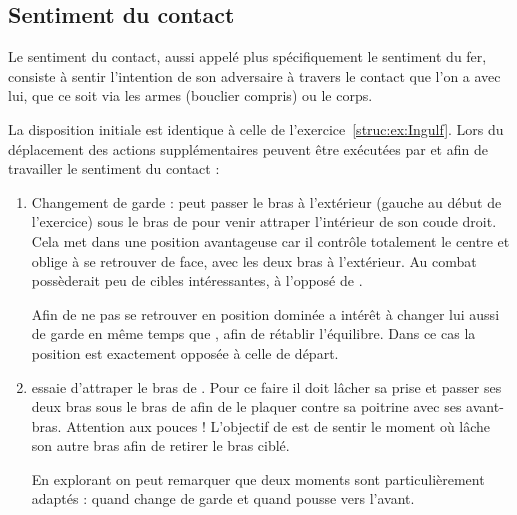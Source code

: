 \subsection{Sentiment du contact}


\begin{definition}

Le sentiment du contact, aussi appelé plus spécifiquement le sentiment du fer, consiste à sentir l'intention de son adversaire à travers le contact que l'on a avec lui, que ce soit via les armes (bouclier compris) ou le corps.
\end{definition}


\begin{exercice}
\label{att:ex:Ingulf-variantes}


La disposition initiale est identique à celle de l'exercice~\ref{struc:ex:Ingulf}.
Lors du déplacement des actions supplémentaires peuvent être exécutées par \A et \D afin de travailler le sentiment du contact :
\begin{enumerate}
	\item Changement de garde : \A peut passer le bras à l'extérieur (gauche au début de l'exercice) sous le bras de \D pour venir attraper l'intérieur de son coude droit.
	Cela met \A dans une position avantageuse car il contrôle totalement le centre et oblige \D à se retrouver de face, avec les deux bras à l'extérieur.
	Au combat \D possèderait peu de cibles intéressantes, à l'opposé de \A.
	
	Afin de ne pas se retrouver en position dominée \D a intérêt à changer lui aussi de garde en même temps que \A, afin de rétablir l'équilibre.
	Dans ce cas la position est exactement opposée à celle de départ.
	
	\item \A essaie d'attraper le bras de \D.
	Pour ce faire il doit lâcher sa prise et passer ses deux bras sous le bras de \D afin de le plaquer contre sa poitrine avec ses avant-bras.
	Attention aux pouces !
	L'objectif de \D est de sentir le moment où \A lâche son autre bras afin de retirer le bras ciblé.
	
	En explorant on peut remarquer que deux moments sont particulièrement adaptés : quand \D change de garde et quand \D pousse vers l'avant.
	

\end{enumerate}
\end{exercice}
